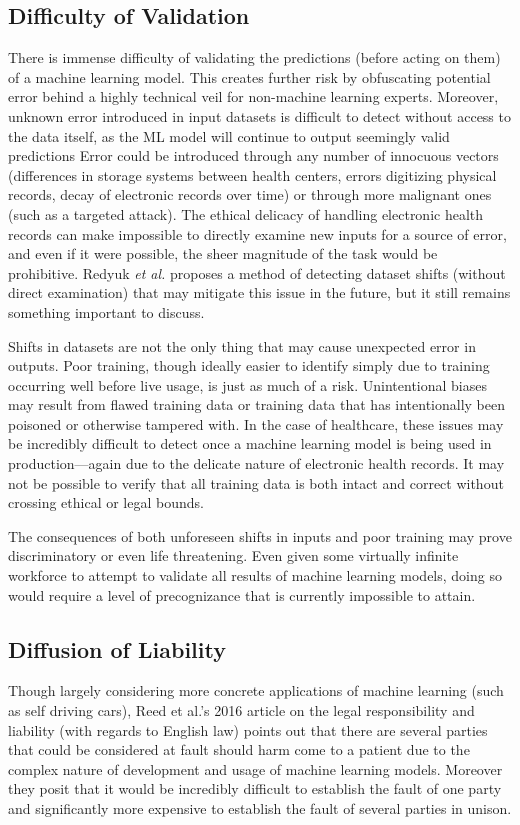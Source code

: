 \documentclass[]{article}
\begin{document}
		\subsection{Difficulty of Validation}
			There is immense difficulty of validating the predictions (before acting on them) of a machine learning model. This creates further risk by obfuscating potential error behind a highly technical veil for non-machine learning experts. Moreover, unknown error introduced in input datasets is difficult to detect without access to the data itself, as the ML model will continue to output seemingly valid predictions\cite{10.1145/3328519.3329126} Error could be introduced through any number of innocuous vectors (differences in storage systems between health centers, errors digitizing physical records, decay of electronic records over time) or through more malignant ones (such as a targeted attack). The ethical delicacy of handling electronic health records\cite{ford2016privacy} can make impossible to directly examine new inputs for a source of error, and even if it were possible, the sheer magnitude of the task would be prohibitive. Redyuk \emph{et al.} proposes a method of detecting dataset shifts (without direct examination) that may mitigate this issue in the future\cite{10.1145/3328519.3329126}, but it still remains something important to discuss.

			Shifts in datasets are not the only thing that may cause unexpected error in outputs. Poor training, though ideally easier to identify simply due to training occurring well before live usage, is just as much of a risk. Unintentional biases may result from flawed training data\cite{7912315} or training data that has intentionally been poisoned or otherwise tampered with\cite{6868201}. In the case of healthcare, these issues may be incredibly difficult to detect once a machine learning model is being used in production---again due to the delicate nature of electronic health records. It may not be possible to verify that all training data is both intact and correct without crossing ethical or legal bounds.
			
			The consequences of both unforeseen shifts in inputs and poor training may prove discriminatory or even life threatening. Even given some virtually infinite workforce to attempt to validate all results of machine learning models, doing so would require a level of precognizance that is currently impossible to attain.

		\subsection{Diffusion of Liability}
			Though largely considering more concrete applications of machine learning (such as self driving cars), Reed {et al.}'s 2016 article on the legal responsibility and liability (with regards to English law) points out that there are several parties that could be considered at fault should harm come to a patient due to the complex nature of development and usage of machine learning models. Moreover they posit that it would be incredibly difficult to establish the fault of one party and significantly more expensive to establish the fault of several parties in unison.\cite{reed2016responsibility}
\end{document}
